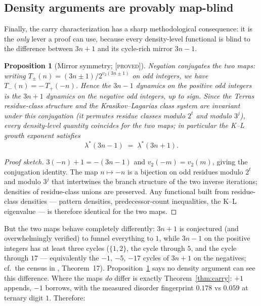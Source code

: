 \documentclass[11pt]{article}
\newtheorem{proposition}[theorem]{Proposition}
\theoremstyle{definition}
\newcommand{\PROVED}{\textup{[\textsc{proved}]}}
\newcommand{\vtwo}{v_2}
\begin{document}
\subsection{Density arguments are provably map-blind}

Finally, the carry characterization has a sharp methodological consequence: it is the
\emph{only} lever a proof can use, because every density-level functional is blind to
the difference between $3n+1$ and its cycle-rich mirror $3n-1$.

\begin{proposition}[Mirror symmetry; \PROVED]\label{prop:mirror}
Negation conjugates the two maps: writing $T_{\pm}(n) = (3n \pm 1)/2^{\vtwo(3n \pm 1)}$
on odd integers, we have $T_{-}(n) = -\,T_{+}(-n)$. Hence the $3n-1$ dynamics on the
positive odd integers is the $3n+1$ dynamics on the negative odd integers, up to sign.
Since the Terras residue-class structure and the Krasikov--Lagarias class system are
invariant under this conjugation (it permutes residue classes modulo $2^t$ and modulo
$3^j$), every density-level quantity coincides for the two maps; in particular the K--L
growth exponent satisfies
\[
\lambda^{*}(3n-1) \;=\; \lambda^{*}(3n+1).
\]
\end{proposition}

\begin{proof}[Proof sketch]
$3(-n) + 1 = -(3n - 1)$ and $\vtwo(-m) = \vtwo(m)$, giving the conjugation identity.
The map $n \mapsto -n$ is a bijection on odd residues modulo $2^t$ and modulo $3^j$
that intertwines the branch structure of the two inverse iterations; densities of
residue-class unions are preserved. Any functional built from residue-class densities
--- pattern densities, predecessor-count inequalities, the K--L eigenvalue --- is
therefore identical for the two maps.
\end{proof}

But the two maps behave completely differently: $3n+1$ is conjectured (and
overwhelmingly verified) to funnel everything to $1$, while $3n-1$ on the positive
integers has at least three cycles ($\{1, 2\}$, the cycle through $5$, and the cycle
through $17$ --- equivalently the $-1$, $-5$, $-17$ cycles of $3n+1$ on the negatives;
cf.\ the census in \cite{Note2026}, Theorem~17). Proposition~\ref{prop:mirror} says no
density argument can see this difference. Where the maps \emph{do} differ is exactly
Theorem~\ref{thm:carry}: $+1$ appends, $-1$ borrows, with the measured disorder
fingerprint $0.178$ vs $0.059$ at ternary digit $1$. Therefore:
\end{document}
